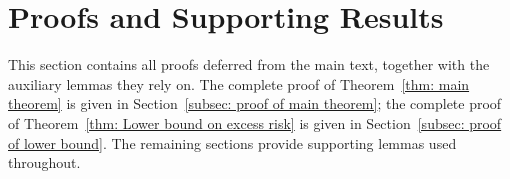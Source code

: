 \section{Proofs and Supporting Results}\label{sec:proofs_ch3}
This section contains all proofs deferred from the main text, together with the auxiliary lemmas they rely on. The complete proof of Theorem~\ref{thm: main theorem} is given in Section~\ref{subsec: proof of main theorem}; the complete proof of Theorem~\ref{thm: Lower bound on excess risk} is given in Section~\ref{subsec: proof of lower bound}. The remaining sections provide supporting lemmas used throughout.






